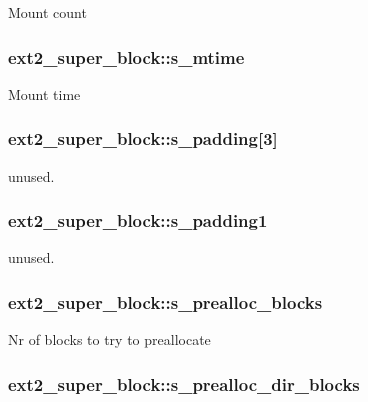 Mount count \hypertarget{structext2__super__block_a3966a51d4e26f1b0280798db227b9720}{
\subsubsection[{s\-\_\-mtime}]{ ext2\-\_\-super\-\_\-block\-::s\-\_\-mtime}}\label{structext2__super__block_a3966a51d4e26f1b0280798db227b9720}
Mount time \hypertarget{structext2__super__block_a81b4e1959f344b5b7445044806d27807}{
\subsubsection[{s\-\_\-padding}]{ ext2\-\_\-super\-\_\-block\-::s\-\_\-padding\mbox{[}3\mbox{]}}}\label{structext2__super__block_a81b4e1959f344b5b7445044806d27807}
unused. \hypertarget{structext2__super__block_a1b0760049d39f6cfb1b26af0a01f64d2}{
\subsubsection[{s\-\_\-padding1}]{ ext2\-\_\-super\-\_\-block\-::s\-\_\-padding1}}\label{structext2__super__block_a1b0760049d39f6cfb1b26af0a01f64d2}
unused. \hypertarget{structext2__super__block_a352689df3b3cb2a357bde6645e3c7f29}{
\subsubsection[{s\-\_\-prealloc\-\_\-blocks}]{ ext2\-\_\-super\-\_\-block\-::s\-\_\-prealloc\-\_\-blocks}}\label{structext2__super__block_a352689df3b3cb2a357bde6645e3c7f29}
Nr of blocks to try to preallocate \hypertarget{structext2__super__block_aa820a721fcbf64ee9aa797bca3171785}{
\subsubsection[{s\-\_\-prealloc\-\_\-dir\-\_\-blocks}]{ ext2\-\_\-super\-\_\-block\-::s\-\_\-prealloc\-\_\-dir\-\_\-blocks}}\label{structext2__super__block_aa820a721fcbf64ee9aa797bca3171785}
